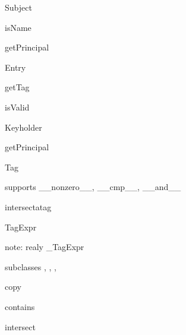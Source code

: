 \documentclass{howto}
\begin{document}
\begin{classdesc}{Subject}{}

\begin{methoddesc}{isName}{}
\end{methoddesc}

\begin{methoddesc}{getPrincipal}{}
\end{methoddesc}

\end{classdesc}

\begin{classdesc}{Entry}{}

\begin{methoddesc}{getTag}{}
\end{methoddesc}

\begin{methoddesc}{isValid}{}
\end{methoddesc}

\end{classdesc}

\begin{classdesc}{Keyholder}{}

\begin{methoddesc}{getPrincipal}{}
\end{methoddesc}

\end{classdesc}

\begin{classdesc}{Tag}{}

supports __nonzero__, __cmp__, __and__

\begin{methoddesc}{intersect}{atag}
\end{methoddesc}

\end{classdesc}

\begin{classdesc}{TagExpr}{}

note: realy _TagExpr

subclasses , , ,

\begin{methoddesc}{copy}{}
\end{methoddesc}

\begin{methoddesc}{contains}{}
\end{methoddesc}

\begin{methoddesc}{intersect}{}
\end{methoddesc}

\end{classdesc}
\end{document}
